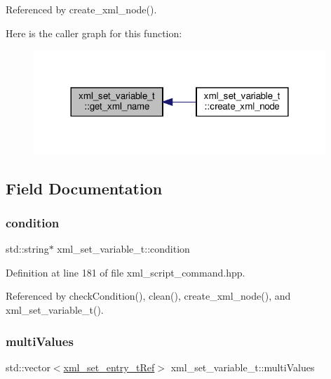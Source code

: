 Referenced by create\+\_\+xml\+\_\+node().

Here is the caller graph for this function\+:
\nopagebreak
\begin{figure}[H]
\begin{center}
\leavevmode
\includegraphics[width=312pt]{dc/db4/classxml__set__variable__t_aa247f1465847c3ee2ec8f7200e2ac401_icgraph}
\end{center}
\end{figure}


\subsection{Field Documentation}
\mbox{\label{classxml__set__variable__t_a6193b0aff8e356ced7ad7b0c65c28f6f}} 
\subsubsection{\texorpdfstring{condition}{condition}}
{\footnotesize\ttfamily std\+::string$\ast$ xml\+\_\+set\+\_\+variable\+\_\+t\+::condition}



Definition at line 181 of file xml\+\_\+script\+\_\+command.\+hpp.



Referenced by check\+Condition(), clean(), create\+\_\+xml\+\_\+node(), and xml\+\_\+set\+\_\+variable\+\_\+t().

\mbox{\label{classxml__set__variable__t_a3a8621898eb705400967bebe067afa8c}} 
\subsubsection{\texorpdfstring{multi\+Values}{multiValues}}
{\footnotesize\ttfamily std\+::vector$<$\hyperlink{xml__script__command_8hpp_aeb61f959795afd2b743d3bec00ee66fa}{xml\+\_\+set\+\_\+entry\+\_\+t\+Ref}$>$ xml\+\_\+set\+\_\+variable\+\_\+t\+::multi\+Values}



